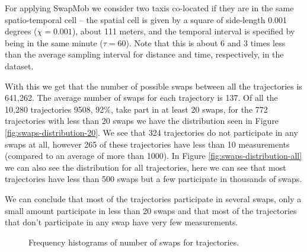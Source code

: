 For applying SwapMob we consider two taxis co-located if they are in
the same spatio-temporal cell -- the spatial cell is given by a square of side-length 0.001 degrees ($\chi = 0.001$), about 111
meters, and the temporal interval is specified by being in the same minute ($\tau = 60$). 
Note that this is about 6 and 3 times less than the average sampling interval for distance and time, respectively, 
in the dataset.

With this we get that the number of possible swaps between all the
trajectories is 641,262. The average number of swaps for each
trajectory is 137. Of all the 10,280 trajectories 9508, 92\%, take part
in at least 20 swaps, for the 772 trajectories with less than 20 swaps
we have the distribution seen in Figure
\ref{fig:swaps-distribution-20}. We see that 324 trajectories do not
participate in any swaps at all, however 265 of these trajectories
have less than 10 measurements (compared to an average of more than
1000). In Figure \ref{fig:swaps-distribution-all} we can also see the
distribution for all trajectories, here we can see that most
trajectories have less than 500 swaps but a few participate in
thousands of swaps.

We can conclude that most of the trajectories participate in several
swaps, only a small amount participate in less than 20 swaps and that
most of the trajectories that don't participate in any swap have very
few measurements.

\begin{figure}
  \hfil
  \caption{Frequency histograms of number of swaps for trajectories.}
  \label{fig:swaps-distribution}
\end{figure}

